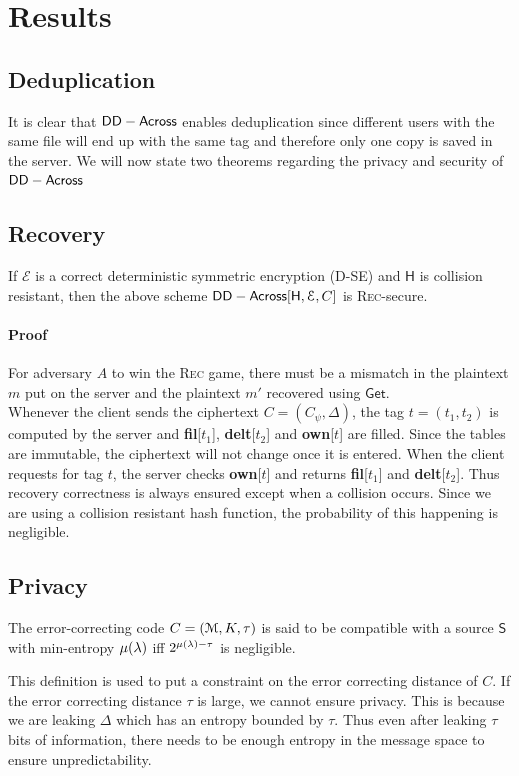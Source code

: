 \chapter{Results}
\label{chap:results}

\section{Deduplication}
It is clear that $\mathsf{DD-Across}$ enables deduplication since different users with the same file will end up with the same tag and therefore only one copy is saved in the server. We will now state two theorems regarding the privacy and security of $\mathsf{DD-Across}$ 

\section{Recovery}
\begin{theorem}
	If $\mathcal{E}$ is a correct deterministic symmetric encryption (D-SE) and $\mathsf{H}$ is collision resistant, then the above scheme $\mathsf{DD-Across} [\mathsf{H},\mathcal{E}, C]$ is \textsc{Rec}-secure.
\end{theorem}
\subsubsection*{Proof}
For adversary $A$ to win the \textsc{Rec} game, there must be a mismatch in the plaintext $m$ put on the server and the plaintext $m'$ recovered using $\mathsf{Get}$.\\ 
Whenever the client sends the ciphertext $C=(C_\psi, \Delta)$, the tag $t=(t_1, t_2)$ is computed by the server and \textbf{fil}[$t_1$], \textbf{delt}[$t_2$] and \textbf{own}[$t$] are filled. Since the tables are immutable, the ciphertext will not change once it is entered. When the client requests for tag $t$, the server checks \textbf{own}[$t$] and returns \textbf{fil}[$t_1$] and \textbf{delt}[$t_2$]. Thus recovery correctness is always ensured except when a collision occurs. Since we are using a collision resistant hash function, the probability of this happening is negligible.

\section{Privacy}
\begin{definition}
	The error-correcting code $C=(\mathcal{M}, K, \tau)$ is said to be compatible with a source $\mathsf{S}$ with min-entropy $\mu(\lambda)$ iff $2^{\mu(\lambda)-\tau}$ is negligible.
	\label{def}
\end{definition}
This definition is used to put a constraint on the error correcting distance of $C$. If the error correcting distance $\tau$ is large, we cannot ensure privacy. This is because we are leaking $\Delta$ which has an entropy bounded by $\tau$. Thus even after leaking $\tau$ bits of information, there needs to be enough entropy in the message space to ensure unpredictability.

